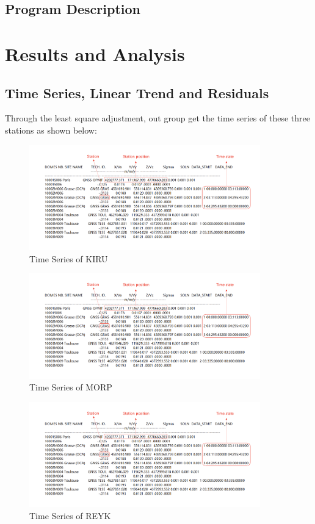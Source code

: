 \documentclass{article}
\begin{document}
\subsection{Program Description}

\section{Results and Analysis}
\subsection{Time Series, Linear Trend and Residuals}
Through the least square adjustment, out group get the time series of these three stations as shown below:
\begin{figure}[htbp]
  \centering
  \includegraphics[width=10cm]{../source/ITRF2008.png}
  \captionsetup{skip=0.2cm}
  \caption{Time Series of KIRU}
  \label{fig:Ori_KIRU}
\end{figure}
\begin{figure}[htbp]
  \centering
  \includegraphics[width=10cm]{../source/ITRF2008.png}
  \caption{Time Series of MORP}
  \label{fig:Ori_MORP}
\end{figure}
\begin{figure}[htbp]
  \centering
  \includegraphics[width=10cm]{../source/ITRF2008.png}
  \caption{Time Series of REYK}
  \label{fig:Ori_REYK}
\end{figure}
\end{document}
